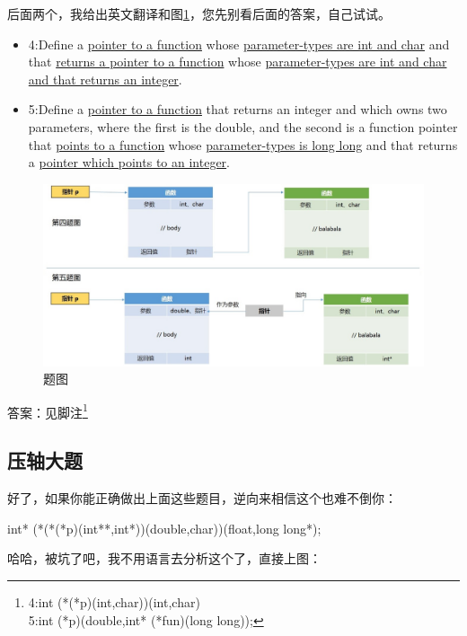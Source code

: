\documentclass[11pt,twoside,a4paper,titlepage]{article}	%
\begin{document}
后面两个，我给出英文翻译和图\ref{fig:qustion_01}，您先别看后面的答案，自己试试。

\begin{itemize}
	\item 4:Define a \uline{pointer to a function} whose \uline{parameter-types are int and char} and that \uline{returns a pointer to a function} whose \uline{parameter-types are int and char and that returns an integer}.
	\item 5:Define a \uline{pointer to a function} that returns an integer and which owns two parameters, where the first is the double, and the second is a function pointer that \uline{points to a function} whose \uline{parameter-types is long long} and that returns a \uline{pointer which points to an integer}.
\end{itemize}

\begin{figure}[H]
\centering
\includegraphics[scale=.5]{../src/qustion_01.jpg}
\caption{题图}
\label{fig:qustion_01}
\end{figure}

答案：见脚注\footnote{4:int (*(*p)(int,char))(int,char) \\ 5:int (*p)(double,int* (*fun)(long long));}

\subsection{压轴大题}
好了，如果你能正确做出上面这些题目，逆向来相信这个也难不倒你：

\begin{center}
int* (*(*(*p)(int**,int*))(double,char))(float,long long*);
\end{center}

哈哈，被坑了吧，我不用语言去分析这个了，直接上图：
\end{document}
